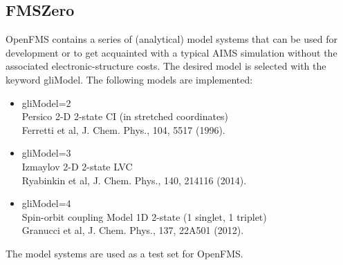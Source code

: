 \documentclass[11pt]{article}
\begin{document}
\subsection{FMSZero}
\label{zero} 

OpenFMS contains a series of (analytical) model systems that can be used for development or to get acquainted with a typical AIMS simulation without the associated electronic-structure costs. The desired model is selected with the keyword gliModel. The following models are implemented:

\begin{itemize}
\item gliModel=2 \\ Persico 2-D 2-state CI (in stretched coordinates) \\ Ferretti et al, J. Chem. Phys., 104, 5517 (1996).

\item gliModel=3 \\ Izmaylov 2-D 2-state LVC \\
   Ryabinkin et al, J. Chem. Phys., 140, 214116 (2014). 
\item gliModel=4 \\ 
Spin-orbit coupling Model 1D 2-state (1 singlet, 1 triplet)  \\
   Granucci et al, J. Chem. Phys., 137, 22A501 (2012). 
\end{itemize}

The model systems are used as a test set for OpenFMS.
\end{document}
